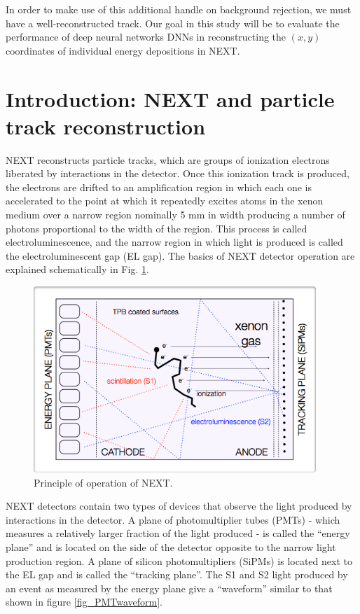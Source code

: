 \documentclass[10pt]{article}
\begin{document}
\noindent In order to make use of this additional handle on background rejection, we must have a well-reconstructed track.  Our goal in this study will be to evaluate the performance of deep 
neural networks DNNs in reconstructing the $(x,y)$ coordinates of individual energy depositions in NEXT.

\section{Introduction: NEXT and particle track reconstruction}
\noindent NEXT reconstructs particle tracks, which are groups of ionization electrons liberated by interactions in the detector.  
Once this ionization track is produced, the
electrons are drifted to an amplification region in which each one is accelerated to the point at which it repeatedly excites atoms in the xenon medium over a narrow region
nominally 5 mm in width producing a number of photons proportional to the width of the region.  This process is called electroluminescence, and the narrow region in which light is
produced is called the electroluminescent gap (EL gap).  The basics of NEXT detector operation are explained schematically in Fig. \ref{fig_SS}.\\

\begin{figure}[!htb]
	\centering
	\includegraphics[width= 0.95\textwidth]{fig/nextEL.png}
	\caption{Principle of operation of NEXT.} \label{fig_SS}
\end{figure}

\noindent NEXT detectors contain two types of devices that observe the light produced by interactions in the detector.  A plane of photomultiplier tubes (PMTs) - which measures a relatively larger
fraction of the light produced - is called the ``energy plane'' and is located on the side of the detector opposite to the narrow light production region. A plane of silicon photomultipliers (SiPMs) is 
located next to the EL gap and is called the ``tracking plane''.  The S1 and S2 light produced by an event as measured by the energy plane give a ``waveform'' similar to that shown in figure 
\ref{fig_PMTwaveform}.\\
\end{document}
